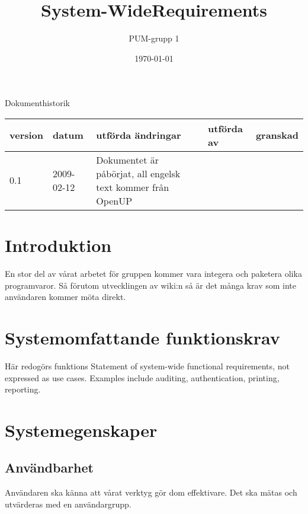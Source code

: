 

\ifpdf
\else
\fi

\title{System-WideRequirements}
\author{PUM-grupp 1}
\date{\today}



\maketitle\thispagestyle{empty}

\newpage

{\centering \Large{Dokumenthistorik\\}}

\vspace{10pt}
\begin{tabularx}{\textwidth}{ |l|l|X|l|l| }
  \hline
    \textbf{version} & \textbf{datum} & \textbf{utförda ändringar} & \textbf{utförda av} & \textbf{granskad} \\
	\hline 
  0.1 & 2009-02-12 &  Dokumentet är påbörjat, all engelsk text kommer från OpenUP & &   \\
  \hline
\end{tabularx}

\newpage

\setcounter{tocdepth}{2}
\tableofcontents
\newpage

\section{Introduktion}
En stor del av vårat arbetet för gruppen kommer vara integera och paketera olika programvaror. Så förutom utvecklingen av wiki:n så är det många krav som inte användaren kommer möta direkt.

\section{Systemomfattande funktionskrav}
Här redogörs funktions
Statement of system-wide functional requirements, not expressed as use cases. Examples include auditing, authentication, printing, reporting.

\section{Systemegenskaper}
\subsection{Användbarhet}
Användaren ska känna att vårat verktyg gör dom effektivare. Det ska mätas och utvärderas med en användargrupp. 

